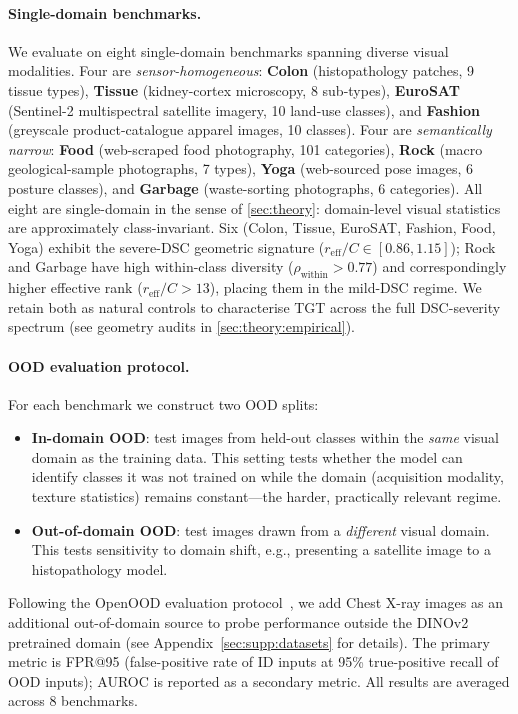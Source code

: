 \documentclass[runningheads]{llncs}
\begin{document}
\paragraph{Single-domain benchmarks.}
We evaluate on eight single-domain benchmarks spanning diverse visual modalities.
Four are \emph{sensor-homogeneous}: \textbf{Colon} (histopathology patches, 9 tissue types), \textbf{Tissue} (kidney-cortex microscopy, 8 sub-types), \textbf{EuroSAT} (Sentinel-2 multispectral satellite imagery, 10 land-use classes), and \textbf{Fashion} (greyscale product-catalogue apparel images, 10 classes).
Four are \emph{semantically narrow}: \textbf{Food} (web-scraped food photography, 101 categories), \textbf{Rock} (macro geological-sample photographs, 7 types), \textbf{Yoga} (web-sourced pose images, 6 posture classes), and \textbf{Garbage} (waste-sorting photographs, 6 categories).
All eight are single-domain in the sense of \cref{sec:theory}: domain-level visual
statistics are approximately class-invariant.
Six (Colon, Tissue, EuroSAT, Fashion, Food, Yoga) exhibit the severe-DSC geometric
signature ($r_{\mathrm{eff}}/C \in [0.86, 1.15]$); Rock and Garbage have high
within-class diversity ($\rho_{\mathrm{within}} > 0.77$) and correspondingly higher
effective rank ($r_{\mathrm{eff}}/C > 13$), placing them in the mild-DSC regime.
We retain both as natural controls to characterise TGT across the full DSC-severity
spectrum (see geometry audits in \cref{sec:theory:empirical}).

\paragraph{OOD evaluation protocol.}
For each benchmark we construct two OOD splits:
\begin{itemize}
  \item \textbf{In-domain OOD}: test images from held-out classes within the \emph{same} visual domain as the training data.
    This setting tests whether the model can identify classes it was not trained on while the domain (acquisition modality, texture statistics) remains constant---the harder, practically relevant regime.
  \item \textbf{Out-of-domain OOD}: test images drawn from a \emph{different} visual domain.
    This tests sensitivity to domain shift, e.g., presenting a satellite image to a histopathology model.
\end{itemize}
Following the OpenOOD evaluation protocol~\cite{Yang2022openood}, we add Chest X-ray images \cite{yang2023medmnist} as an additional out-of-domain source to probe performance outside the DINOv2 pretrained domain (see Appendix~\ref{sec:supp:datasets} for details).
The primary metric is FPR@95 (false-positive rate of ID inputs at 95\% true-positive recall of OOD inputs); AUROC is reported as a secondary metric.
All results are averaged across 8 benchmarks.
\end{document}
